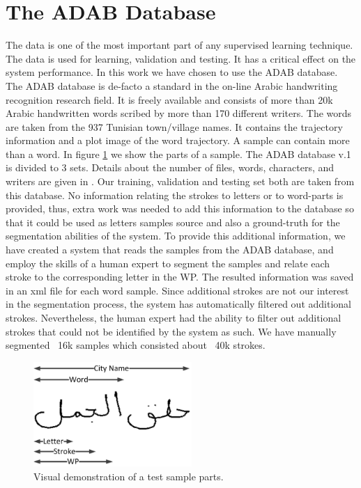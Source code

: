 \documentclass[journal,compsoc]{IEEEtran}
\begin{document}
\section{The ADAB Database}
\label{sec:database}
The data is one of the most important part of any supervised learning technique. The data is used for learning, validation and testing. It has a critical effect on the system performance. In this work we have chosen to use the ADAB database. The ADAB database is de-facto a standard in the on-line Arabic handwriting recognition research field. It is freely available and consists of more than 20k Arabic handwritten words scribed by more than 170 different writers. The words are taken from the 937 Tunisian town/village names. It contains the trajectory information and a plot image of the word trajectory. A sample can contain more than a word. In figure \ref{fig:sample_parts} we show the parts of a sample. The ADAB database v.1 is divided to 3 sets. Details about the number of files, words, characters, and writers are given in \cite{el2009icdar}. Our training, validation and testing set both are taken from this database. 
No information relating the strokes to letters or to word-parts is provided, thus, extra work was needed to add this information to the database so that it could be used as letters samples source and also a ground-truth for the segmentation abilities of the system. To provide this additional information, we have created a system that reads the samples from the ADAB database, and employ the skills of a human expert to segment the samples and relate each stroke to the corresponding letter in the WP. The resulted information was saved in an xml file for each word sample. Since additional strokes are not our interest in the segmentation process, the system has automatically filtered out additional strokes. Nevertheless, the human expert had the ability to filter out additional strokes that could not be identified by the system as such. We have manually segmented ~16k samples which consisted about ~40k strokes. 

\begin{figure}
\centering
\includegraphics[width=6cm]{./figures/sample_parts}
\caption{Visual demonstration of a test sample parts.}
\label{fig:sample_parts}
\end{figure}
\end{document}
